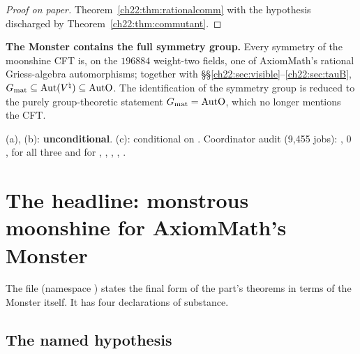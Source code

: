 \begin{proof}[Proof on paper]
Theorem~\ref{ch22:thm:rationalcomm} with the hypothesis discharged by Theorem~\ref{ch22:thm:commutant}.
\end{proof}
\begin{physics}
\textbf{The Monster contains the full symmetry group.}  Every symmetry of the moonshine CFT is, on the $196884$ weight-two
fields, one of AxiomMath's rational Griess-algebra automorphisms; together with \S\S\ref{ch22:sec:visible}--\ref{ch22:sec:tauB},
$G_{\mathrm{mat}}\subseteq\operatorname{Aut}({V^{\natural}})\subseteq\mathrm{AutO}$.  The identification of the symmetry group is reduced to
the purely group-theoretic statement $G_{\mathrm{mat}}=\mathrm{AutO}$, which no longer mentions the CFT.
\end{physics}
\begin{status}
(a), (b): \textbf{unconditional}.  (c): conditional on .  Coordinator audit
 (9,455 jobs): ,
$0$ , for all three and for , ,
, , .
\end{status}


\section{The headline: monstrous moonshine for AxiomMath's Monster}\label{ch22:sec:headline}

The file  (namespace ) states the
final form of the part's theorems in terms of the Monster itself.  It has four declarations of substance.

\subsection{The named hypothesis}

